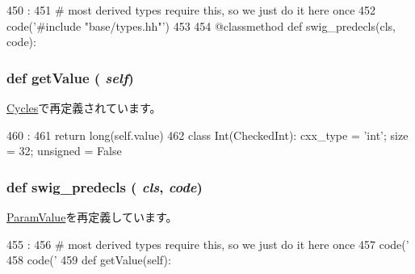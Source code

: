 \begin{DoxyCode}
450                                :
451         # most derived types require this, so we just do it here once
452         code('#include "base/types.hh"')
453 
454     @classmethod
    def swig_predecls(cls, code):
\end{DoxyCode}
\hypertarget{classm5_1_1params_1_1CheckedInt_acc340fbd4335fa34f9d57fb454b28ed0}{
\subsubsection[{getValue}]{\setlength{\rightskip}{0pt plus 5cm}def getValue ( {\em self})}}
\label{classm5_1_1params_1_1CheckedInt_acc340fbd4335fa34f9d57fb454b28ed0}


\hyperlink{classm5_1_1params_1_1Cycles_acc340fbd4335fa34f9d57fb454b28ed0}{Cycles}で再定義されています。


\begin{DoxyCode}
460                       :
461         return long(self.value)
462 
class Int(CheckedInt):      cxx_type = 'int';      size = 32; unsigned = False
\end{DoxyCode}
\hypertarget{classm5_1_1params_1_1CheckedInt_ab3dbcf5716623eac67a8ccc074fa7e13}{
\subsubsection[{swig\_\-predecls}]{\setlength{\rightskip}{0pt plus 5cm}def swig\_\-predecls ( {\em cls}, \/   {\em code})}}
\label{classm5_1_1params_1_1CheckedInt_ab3dbcf5716623eac67a8ccc074fa7e13}


\hyperlink{classm5_1_1params_1_1ParamValue_ab3dbcf5716623eac67a8ccc074fa7e13}{ParamValue}を再定義しています。


\begin{DoxyCode}
455                                 :
456         # most derived types require this, so we just do it here once
457         code('%
458         code('%
459 
    def getValue(self):
\end{DoxyCode}


